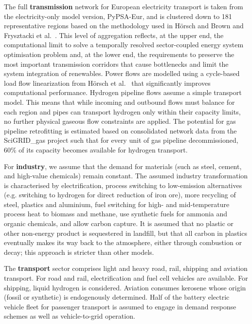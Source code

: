 The full \textbf{transmission} network for European electricity transport is
taken from the electricity-only model version,
PyPSA-Eur,\cite{horschPyPSAEurOpen2018} and is clustered down to 181
representative regions based on the methodology used in Hörsch and
Brown\cite{Hoersch2017} and Frysztacki et al.~\cite{frysztackiStrongEffect2021}.
This level of aggregation reflects, at the upper end, the computational limit to
solve a temporally resolved sector-coupled energy system optimisation problem
and, at the lower end, the requirements to preserve the most important
transmission corridors that cause bottlenecks and limit the system integration
of renewables. Power flows are modelled using a cycle-based load flow
linearization from Hörsch et al.~\cite{horschLinearOptimal2018} that
significantly improves computational performance. Hydrogen pipeline flows assume
a simple transport model. This means that while incoming and outbound flows must
balance for each region and pipes can transport hydrogen only within their
capacity limits, no further physical gaseous flow constraints are applied. The
potential for gas pipeline retrofitting is estimated based on consolidated
network data from the SciGRID\_gas project \cite{plutaSciGRIDGas2022a} such that
for every unit of gas pipeline decommissioned, 60\% of its capacity becomes
available for hydrogen transport.\cite{gasforclimateEuropeanHydrogen2020}

For \textbf{industry}, we assume that the demand for materials (such as steel,
cement, and high-value chemicals) remain constant. The assumed industry
transformation is characterised by electrification, process switching to
low-emission alternatives (e.g. switching to hydrogen for direct reduction of
iron ore\cite{voglAssessmentHydrogen2018}), more recycling of steel, plastics
and aluminium\cite{circular_economy}, fuel switching for high- and
mid-temperature process heat to biomass and methane, use synthetic fuels for
ammonia and organic chemicals, and allow carbon capture. It is assumed that no
plastic or other non-energy product is sequestered in landfill, but that all
carbon in plastics eventually makes its way back to the atmosphere, either
through combustion or decay; this approach is stricter than other models.
\cite{in-depth_2018}

The \textbf{transport} sector comprises light and heavy road, rail, shipping and
aviation transport. For road and rail, electrification and fuel cell vehicles
are available. For shipping, liquid hydrogen is considered. Aviation consumes
kerosene whose origin (fossil or synthetic) is endogenously determined. Half of
the battery electric vehicle fleet for passenger transport is assumed to engage
in demand response schemes as well as vehicle-to-grid operation.

